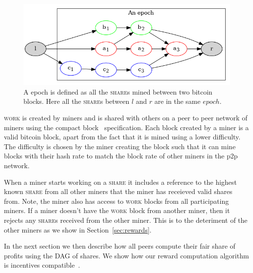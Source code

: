 \documentclass{article}
\begin{document}
\begin{figure}[h]
  \includegraphics[width=1.0\textwidth]{epoch}
  \caption{A epoch is defined as all the \textsc{share}s mined between two
    bitcoin blocks. Here all the \textsc{share}s between $l$ and $r$ are in
    the same $epoch$.}\label{fig:epoch}
\end{figure}

\textsc{work} is created by miners and is shared with others on a peer
to peer network of miners using the compact
block~\cite{compact-blocks} specification. Each block created by a
miner is a valid bitcoin block, apart from the fact that it is mined
using a lower difficulty. The difficulty is chosen by the miner
creating the block such that it can mine blocks with their hash rate
to match the block rate of other miners in the p2p network.

When a miner starts working on a \textsc{share} it includes a
reference to the highest known \textsc{share} from all other miners
that the miner has receieved valid shares from. Note, the miner also
has access to \textsc{work} blocks from all participating miners. If a
miner doesn't have the \textsc{work} block from another miner, then it
rejects any \textsc{share}s received from the other miner. This is to
the deteriment of the other miners as we show in
Section~\ref{sec:rewards}.

In the next section we then describe how all peers compute their fair
share of profits using the DAG of shares. We show how our reward
computation algorithm is incentives
compatible~\cite{incentives-compatible}.

  
\end{document}
